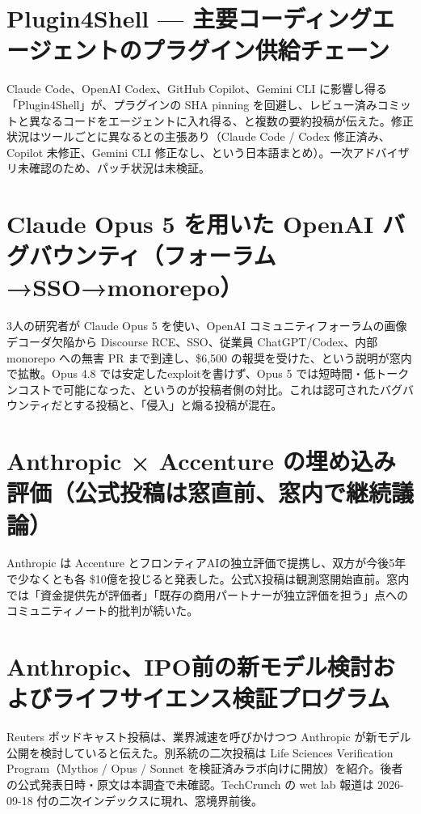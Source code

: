 \section{Plugin4Shell — 主要コーディングエージェントのプラグイン供給チェーン}
Claude Code、OpenAI Codex、GitHub Copilot、Gemini CLI に影響し得る「Plugin4Shell」が、プラグインの SHA pinning を回避し、レビュー済みコミットと異なるコードをエージェントに入れ得る、と複数の要約投稿が伝えた。修正状況はツールごとに異なるとの主張あり（Claude Code / Codex 修正済み、Copilot 未修正、Gemini CLI 修正なし、という日本語まとめ）。一次アドバイザリ未確認のため、パッチ状況は未検証。

\section{Claude Opus 5 を用いた OpenAI バグバウンティ（フォーラム→SSO→monorepo）}
3人の研究者が Claude Opus 5 を使い、OpenAI コミュニティフォーラムの画像デコーダ欠陥から Discourse RCE、SSO、従業員 ChatGPT/Codex、内部 monorepo への無害 PR まで到達し、\$6,500 の報奨を受けた、という説明が窓内で拡散。Opus 4.8 では安定したexploitを書けず、Opus 5 では短時間・低トークンコストで可能になった、というのが投稿者側の対比。これは認可されたバグバウンティだとする投稿と、「侵入」と煽る投稿が混在。

\section{Anthropic × Accenture の埋め込み評価（公式投稿は窓直前、窓内で継続議論）}
Anthropic は Accenture とフロンティアAIの独立評価で提携し、双方が今後5年で少なくとも各 \$10億を投じると発表した。公式X投稿は観測窓開始直前。窓内では「資金提供先が評価者」「既存の商用パートナーが独立評価を担う」点へのコミュニティノート的批判が続いた。

\section{Anthropic、IPO前の新モデル検討およびライフサイエンス検証プログラム}
Reuters ポッドキャスト投稿は、業界減速を呼びかけつつ Anthropic が新モデル公開を検討していると伝えた。別系統の二次投稿は Life Sciences Verification Program（Mythos / Opus / Sonnet を検証済みラボ向けに開放）を紹介。後者の公式発表日時・原文は本調査で未確認。TechCrunch の wet lab 報道は 2026-09-18 付の二次インデックスに現れ、窓境界前後。

